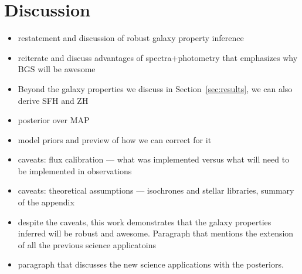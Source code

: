 \section{Discussion} \label{sec:discuss}
\begin{itemize}
    \item restatement and discussion of robust galaxy property inference
    \item reiterate and discuss advantages of spectra+photometry that
        emphasizes why BGS will be awesome
    \item Beyond the galaxy properties we discuss in Section~\ref{sec:results},
        we can also derive SFH and ZH
    \item posterior over MAP
    \item model priors and preview of how we can correct for it
    \item caveats: flux calibration --- what was implemented versus what will
        need to be implemented in observations
    \item caveats: theoretical assumptions --- isochrones and stellar
        libraries, summary of the appendix
    \item despite the caveats, this work demonstrates that the galaxy
        properties inferred will be robust and awesome. Paragraph that mentions
        the extension of all the previous science applicatoins 
    \item paragraph that discusses the new science applications with the
        posteriors. 
\end{itemize}

